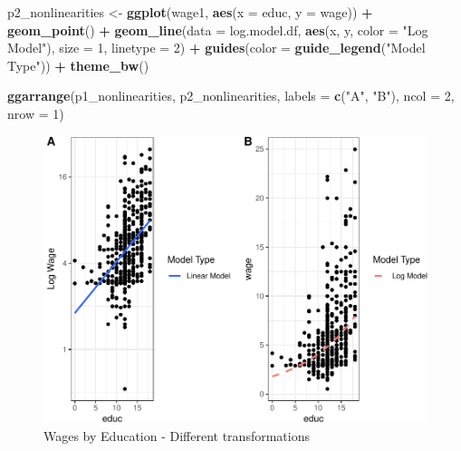 \documentclass[]{book}
\newenvironment{Shaded}{\begin{snugshade}}{\end{snugshade}}
\newcommand{\DataTypeTok}[1]{\textcolor[rgb]{0.13,0.29,0.53}{#1}}
\newcommand{\DecValTok}[1]{\textcolor[rgb]{0.00,0.00,0.81}{#1}}
\newcommand{\KeywordTok}[1]{\textcolor[rgb]{0.13,0.29,0.53}{\textbf{#1}}}
\newcommand{\NormalTok}[1]{#1}
\newcommand{\OperatorTok}[1]{\textcolor[rgb]{0.81,0.36,0.00}{\textbf{#1}}}
\newcommand{\StringTok}[1]{\textcolor[rgb]{0.31,0.60,0.02}{#1}}
\begin{document}
\begin{Shaded}
\begin{Highlighting}[]
\NormalTok{p2_nonlinearities <-}\StringTok{ }\KeywordTok{ggplot}\NormalTok{(wage1, }\KeywordTok{aes}\NormalTok{(}\DataTypeTok{x =}\NormalTok{ educ, }\DataTypeTok{y =}\NormalTok{ wage))  }\OperatorTok{+}
\StringTok{  }\KeywordTok{geom_point}\NormalTok{()   }\OperatorTok{+}
\StringTok{  }\KeywordTok{geom_line}\NormalTok{(}\DataTypeTok{data =}\NormalTok{ log.model.df, }\KeywordTok{aes}\NormalTok{(x, y, }\DataTypeTok{color =} \StringTok{"Log Model"}\NormalTok{), }\DataTypeTok{size =} \DecValTok{1}\NormalTok{, }\DataTypeTok{linetype =} \DecValTok{2}\NormalTok{)  }\OperatorTok{+}
\StringTok{  }\KeywordTok{guides}\NormalTok{(}\DataTypeTok{color =} \KeywordTok{guide_legend}\NormalTok{(}\StringTok{"Model Type"}\NormalTok{)) }\OperatorTok{+}\StringTok{ }
\StringTok{  }\KeywordTok{theme_bw}\NormalTok{()}
\end{Highlighting}
\end{Shaded}

\begin{Shaded}
\begin{Highlighting}[]
\KeywordTok{ggarrange}\NormalTok{(p1_nonlinearities, p2_nonlinearities,  }
          \DataTypeTok{labels =} \KeywordTok{c}\NormalTok{(}\StringTok{"A"}\NormalTok{, }\StringTok{"B"}\NormalTok{),}
          \DataTypeTok{ncol =} \DecValTok{2}\NormalTok{, }\DataTypeTok{nrow =} \DecValTok{1}\NormalTok{)}
\end{Highlighting}
\end{Shaded}

\begin{figure}

{\centering \includegraphics[width=0.8\linewidth]{MEM5220_R_files/figure-latex/fig15-1} 

}

\caption{Wages by Education - Different transformations}\label{fig:fig15}
\end{figure}
\end{document}
